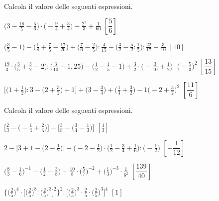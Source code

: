 \begin{esercizio}[\Ast]
\label{ese:3.147}
 Calcola il valore delle seguenti espressioni.
\begin{enumeratea}
\spazielenx
\item \(\displaystyle{\bigg(3-\frac{18}{5}-\frac{5}{6}\bigg)\cdot%
\bigg(-{\frac{9}{4}}+\frac{3}{4}\bigg)-\frac{2^{2}}{3}+\frac{1}{60}}\)
  \hfill \(\left[\dfrac{5}{6} \right]\)
\item \(\displaystyle{\bigg(\frac{3}{5}-1\bigg)-\bigg(\frac{1}{8}+\frac{7}{5}-
\frac{17}{20}\bigg)+%
\bigg(\frac{7}{6}-\frac{2}{5}\bigg):\frac{4}{15}-\bigg(\frac{3}{2}-\frac{5}{2}:
\frac{1}{5}\bigg):\frac{22}{17}-%
\frac{3}{10}}\)
  \hfill \(\left[10 \right]\)
\item \(\displaystyle{\frac{19}{3}\cdot\bigg(\frac{3}{5}+\frac{3}{2}-2\bigg):
\bigg(\frac{3}{10}-1,25\bigg)-%
\bigg(\frac{1}{2}-\frac{1}{5}-1\bigg)+\frac{3}{2}\cdot\bigg(-{\frac{3}{10}}+
\frac{1}{2}\bigg)\cdot%
\bigg(-{\frac{5}{3}}\bigg)^{2}}\)
  \hfill \(\left[\dfrac{13}{15} \right]\)
\item \(\displaystyle{\bigg[\bigg(1+\frac{1}{2}\bigg):3-\bigg(2+
\frac{3}{2}\bigg)+1\bigg]+\bigg(3-\frac{3}{4}\bigg)%
+\bigg(\frac{1}{3}+\frac{3}{2}\bigg)-1\bigg(-2+\frac{3}{2}\bigg)^{2}}\)
  \hfill \(\left[\dfrac{11}{6} \right]\)
\end{enumeratea}
\end{esercizio}

\begin{esercizio}[\Ast]
\label{ese:3.148}
 Calcola il valore delle seguenti espressioni.
\begin{enumeratea}
\spazielenx
\item \(\displaystyle{\bigg[\frac{2}{3}-\bigg(-\frac{1}{4}+\frac{2}{5}\bigg)
\bigg]-\bigg[\frac{3}{5}-%
\bigg(\frac{3}{4}-\frac{1}{3}\bigg)\bigg]}\)
  \hfill \(\left[\frac{1}{3} \right]\)
\item \(\displaystyle{2-\bigg[3+1-\bigg(2-\frac{1}{2}\bigg)\bigg]-
\bigg(-2-\frac{1}{2}\bigg)\cdot%
\bigg(\frac{1}{2}-\frac{3}{4}+\frac{1}{6}\bigg):\bigg(-{\frac{1}{2}}\bigg)}\)
  \hfill \(\left[-\dfrac{1}{12} \right]\)
\item \(\displaystyle{\bigg(\frac{8}{3}-\frac{1}{6}\bigg)^{-1}-
\bigg(\frac{1}{2}-\frac{3}{8}\bigg)+\frac{10}{8}\cdot%
\bigg(\frac{5}{7}\bigg)^{-2}+\bigg(\frac{1}{3}\bigg)^{-3}\cdot
\frac{1}{6^{2}}}\)
  \hfill \(\left[\dfrac{139}{40} \right]\)
\item \(\displaystyle{\bigg\{\bigg(\frac{2}{5}\bigg)^{4}\cdot
\bigg[\bigg(\frac{2}{5}\bigg)^{8}:%
\bigg(\frac{2}{5}\bigg)^{3}\bigg]^{2}\bigg\}^{2}:
\bigg[\bigg(\frac{2}{5}\bigg)^{3}\cdot{\frac{2}{5}}\cdot%
\bigg(\frac{2}{5}\bigg)^{3}\bigg]^{4}}\)
  \hfill \(\left[1 \right]\)
\end{enumeratea}
\end{esercizio}

